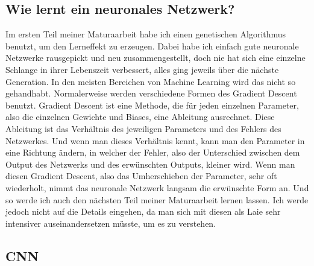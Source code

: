 \documentclass[11pt,a4paper,ngerman]{article}
\begin{document}
\subsection{Wie lernt ein neuronales Netzwerk?}

Im ersten Teil meiner Maturaarbeit habe ich einen genetischen Algorithmus benutzt, um den Lerneffekt zu erzeugen. Dabei habe ich einfach gute neuronale Netzwerke rausgepickt und neu zusammengestellt, doch nie hat sich eine einzelne Schlange in ihrer Lebenszeit verbessert, alles ging jeweils über die nächste Generation. In den meisten Bereichen von Machine Learning wird das nicht so gehandhabt. Normalerweise werden verschiedene Formen des Gradient Descent benutzt. Gradient Descent ist eine Methode, die für jeden einzelnen Parameter, also die einzelnen Gewichte und Biases, eine Ableitung ausrechnet. Diese Ableitung ist das Verhältnis des jeweiligen Parameters und des Fehlers des Netzwerkes. Und wenn man dieses Verhältnis kennt, kann man den Parameter in eine Richtung ändern, in welcher der Fehler, also der Unterschied zwischen dem Output des Netzwerks und des erwünschten Outputs, kleiner wird. Wenn man diesen Gradient Descent, also das Umherschieben der Parameter, sehr oft wiederholt, nimmt das neuronale Netzwerk langsam die erwünschte Form an. Und so werde ich auch den nächsten Teil meiner Maturaarbeit lernen lassen. Ich werde jedoch nicht auf die Details eingehen, da man sich mit diesen als Laie sehr intensiver auseinandersetzen müsste, um es zu verstehen.

\subsection{CNN}
\end{document}
